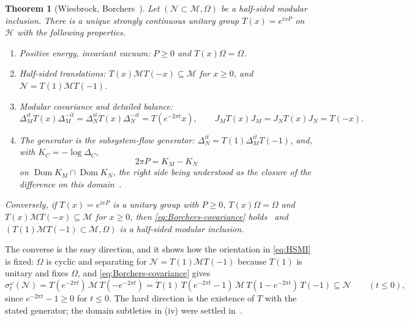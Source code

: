 \documentclass[a4paper,11pt]{article}
\newtheorem{theorem}{Theorem}
\theoremstyle{definition}
\begin{document}
\begin{theorem}[Wiesbrock, Borchers~{\cite{Wiesbrock1993,Borchers1992,ArakiZsido2005}}]\label{thm:HSMI}
Let $(\mathcal N\subset\mathcal M,\Omega)$ be a half-sided modular inclusion. There is a unique strongly continuous unitary group $T(x)=e^{ixP}$ on $\mathcal H$ with the following properties.
\begin{enumerate}
 \item[\rm(i)] \emph{Positive energy, invariant vacuum:} $P\ge0$ and $T(x)\Omega=\Omega$.
 \item[\rm(ii)] \emph{Half-sided translations:} $T(x)\mathcal MT(-x)\subseteq\mathcal M$ for $x\ge0$, and $\mathcal N=T(1)\mathcal MT(-1)$.
 \item[\rm(iii)] \emph{Modular covariance and detailed balance:}
 \begin{equation}
  \Delta_M^{it}T(x)\Delta_M^{-it}=\Delta_N^{it}T(x)\Delta_N^{-it}=T(e^{-2\pi t}x),
  \qquad
  J_MT(x)J_M=J_NT(x)J_N=T(-x).
  \label{eq:Borchers-covariance}
 \end{equation}
 \item[\rm(iv)] \emph{The generator is the subsystem-flow generator:} $\Delta_N^{it}=T(1)\Delta_M^{it}T(-1)$, and, with $K_C=-\log\Delta_C$,
 \begin{equation}
  2\pi P=K_M-K_N
  \label{eq:HSMI-P}
 \end{equation}
 on $\operatorname{Dom}K_M\cap\operatorname{Dom}K_N$, the right side being understood as the closure of the difference on this domain~\cite{ArakiZsido2005}.
\end{enumerate}
Conversely, if $T(x)=e^{ixP}$ is a unitary group with $P\ge0$, $T(x)\Omega=\Omega$ and $T(x)\mathcal MT(-x)\subseteq\mathcal M$ for $x\ge0$, then \eqref{eq:Borchers-covariance} holds~\cite{Borchers1992} and $(T(1)\mathcal MT(-1)\subset\mathcal M,\Omega)$ is a half-sided modular inclusion.
\end{theorem}

The converse is the easy direction, and it shows how the orientation in \eqref{eq:HSMI} is fixed: $\Omega$ is cyclic and separating for $\mathcal N=T(1)\mathcal MT(-1)$ because $T(1)$ is unitary and fixes $\Omega$, and \eqref{eq:Borchers-covariance} gives
\begin{equation}
 \sigma^\omega_t(\mathcal N)=T(e^{-2\pi t})\,\mathcal M\,T(-e^{-2\pi t})
 =T(1)\,T(e^{-2\pi t}-1)\,\mathcal M\,T(1-e^{-2\pi t})\,T(-1)\subseteq\mathcal N
 \qquad(t\le0),
 \label{eq:HSMI-orbit}
\end{equation}
since $e^{-2\pi t}-1\ge0$ for $t\le0$. The hard direction is the existence of $T$ with the stated generator; the domain subtleties in (iv) were settled in~\cite{ArakiZsido2005}.
\end{document}
